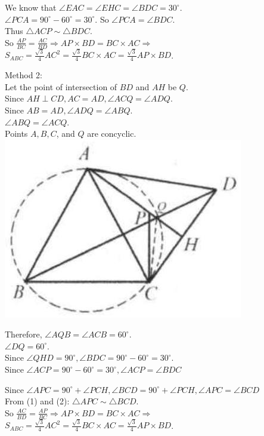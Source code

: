 \documentclass{article}
\begin{document}
We know that \(\angle E A C=\angle E H C=\angle B D C=30^{\circ}\).\\
\(\angle P C A=90^{\circ}-60^{\circ}=30^{\circ}\). So \(\angle P C A=\angle B D C\).\\
Thus \(\triangle A C P \sim \triangle B D C\).\\
So \(\frac{A P}{B C}=\frac{A C}{B D} \Rightarrow A P \times B D=B C \times A C \Rightarrow\) \(S_{A B C}=\frac{\sqrt{3}}{4} A C^{2}=\frac{\sqrt{3}}{4} B C \times A C=\frac{\sqrt{3}}{4} A P \times B D\).

Method 2:\\
Let the point of intersection of \(B D\) and \(A H\) be \(Q\).\\
Since \(A H \perp C D, A C=A D, \angle A C Q=\angle A D Q\).\\
Since \(A B=A D, \angle A D Q=\angle A B Q\).\\
\(\angle A B Q=\angle A C Q\).\\
Points \(A, B, C\), and \(Q\) are concyclic.\\
\centering
\includegraphics[width=\textwidth]{images/198.jpg}

Therefore, \(\angle A Q B=\angle A C B=60^{\circ}\).\\
\(\angle D Q=60^{\circ}\).\\
Since \(\angle Q H D=90^{\circ}, \angle B D C=90^{\circ}-60^{\circ}=30^{\circ}\).\\
Since \(\angle A C P=90^{\circ}-60^{\circ}=30^{\circ}, \angle A C P=\angle B D C\)

Since \(\angle A P C=90^{\circ}+\angle P C H, \angle B C D=90^{\circ}+\angle P C H, \angle A P C=\angle B C D\)\\
From (1) and (2): \(\triangle A P C \sim \triangle B C D\).\\
So \(\frac{A C}{B D}=\frac{A P}{B C} \Rightarrow A P \times B D=B C \times A C \Rightarrow\)\\
\(S_{A B C}=\frac{\sqrt{3}}{4} A C^{2}=\frac{\sqrt{3}}{4} B C \times A C=\frac{\sqrt{3}}{4} A P \times B D\).
\end{document}

